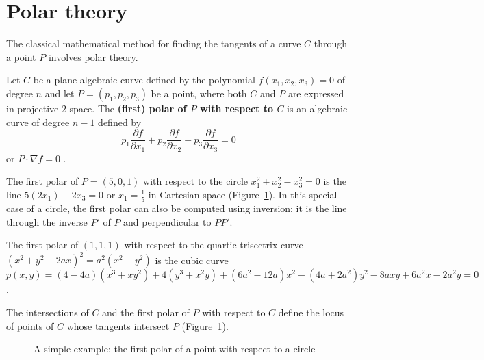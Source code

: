 \documentclass[11pt]{article}
\begin{document}
\section{Polar theory}
\label{sec:polar}

The classical mathematical method for finding the tangents of a curve $C$
through a point $P$ involves polar theory.

\begin{defn2}
Let $C$ be a plane algebraic curve defined by the polynomial $f(x_1,x_2,x_3)=0$
of degree $n$ and let $P = (p_1,p_2,p_3)$ be a point, where both $C$ and $P$ 
are expressed in projective 2-space.
The {\bf (first) polar of $P$ with respect to $C$} 
is an algebraic curve of degree $n-1$ defined by
\[
	p_1 \frac{\partial f}{\partial x_1} +
	p_2 \frac{\partial f}{\partial x_2} +
	p_3 \frac{\partial f}{\partial x_3} = 0
\]
or $P \cdot \nabla f = 0$ \cite{semple85}.	%
\end{defn2}

\begin{example}
The first polar of $P=(5,0,1)$ with respect to the circle 
$x_1^2 + x_2^2 - x_3^2 = 0$ is the line
$5(2x_1) - 2x_3 = 0$ or $x_1 = \frac{1}{5}$ in Cartesian space
(Figure~\ref{fig:polar}).
In this special case of a circle, the first polar can also be computed
using inversion: it is the line through the inverse $P'$ of $P$ 
and perpendicular to $PP'$.

The first polar of $(1,1,1)$ with respect to the quartic trisectrix curve
$(x^2 + y^2 - 2ax)^2 = a^2(x^2 + y^2)$ \cite{lawrence72} %
is the cubic curve $p(x,y) = 
(4-4a)(x^3 + xy^2) + 4(y^3 + x^2y) + (6a^2 - 12a)x^2 - (4a+2a^2)y^2 - 8axy + 6a^2x - 2a^2y = 0$.
\end{example}

\begin{theorem} %
The intersections of $C$ and the first polar of $P$ with respect to $C$ 
define the locus of points of $C$ whose tangents intersect $P$ 
(Figure~\ref{fig:polar}).
\end{theorem}



\begin{figure}[h]
\hspace{1.5in} \setjjpopo
\caption{A simple example: the first polar of a point with respect to a circle}
\label{fig:polar}
\end{figure}
\end{document}
